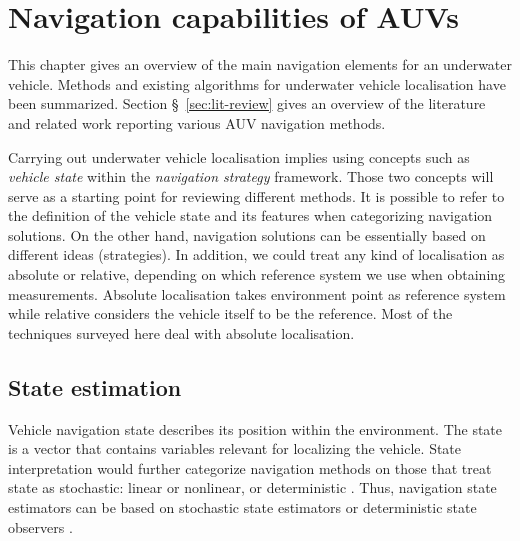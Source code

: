 \chapter{Navigation capabilities of AUVs} \label{chap:capabilities}
This chapter gives an overview of the main navigation elements for an underwater vehicle. Methods and existing algorithms for underwater vehicle localisation have been summarized. Section \S~\ref{sec:lit-review}  gives an overview of the literature and related work reporting various AUV navigation methods. 

Carrying out underwater vehicle localisation implies using concepts such as \textit{vehicle state} within the \textit{navigation strategy} framework. Those two concepts will serve as a starting point for reviewing different methods. It is possible to refer to the definition of the vehicle state and its features when categorizing navigation solutions. On the other hand, navigation solutions can be essentially based on different ideas (strategies). In addition, we could treat any kind of localisation as absolute or relative, depending on which reference system we use when obtaining measurements. Absolute localisation takes environment point as reference system while relative considers the vehicle itself to be the reference. Most of the techniques surveyed here deal with absolute localisation. 
\section{State estimation}
Vehicle navigation state describes its position within the environment. The state is a vector that contains variables relevant for localizing the vehicle. State interpretation would further categorize navigation methods on those that treat state as stochastic: linear or nonlinear, or deterministic \cite{kinsey06}. Thus, navigation state estimators can be based on stochastic state estimators or deterministic state observers \cite{kinsey06}.
